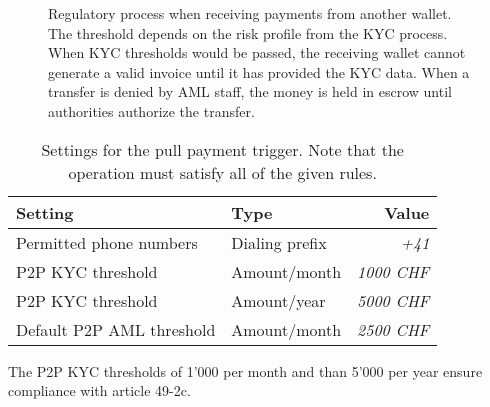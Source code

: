\begin{figure}[h!]
\begin{center}
  \end{center}
  \caption{Regulatory process when receiving payments from another wallet.
    The threshold depends on the risk profile from the KYC process.
    When KYC thresholds would be passed, the receiving wallet cannot
    generate a valid invoice until it has provided the KYC data.
    When a transfer is denied by AML staff, the money is held in escrow
    until authorities authorize the transfer.}
\end{figure}


\begin{table}[h!]
  \caption{Settings for the pull payment trigger. Note that the operation
  must satisfy all of the given rules.}
  \begin{tabular}{l|l|r}
    {\bf Setting}             & {\bf Type}      & {\bf Value} \\ \hline \hline
    Permitted phone numbers   & Dialing prefix  & {\em +41} \\
    P2P KYC threshold         & Amount/month    & {\em  1000 CHF} \\
    P2P KYC threshold         & Amount/year     & {\em  5000 CHF} \\
    Default P2P AML threshold & Amount/month    & {\em  2500 CHF} \\
  \end{tabular}
\end{table}

The P2P KYC thresholds of 1'000 \CURRENCY{} per month and than 5'000
\CURRENCY{} per year ensure compliance with article 49-2c.
